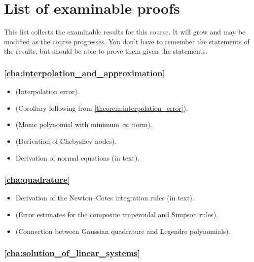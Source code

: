 \chapter*{List of examinable proofs}%
This list collects the examinable results for this course.
It will grow and may be modified as the course progresses.
You don't have to remember the statements of the results,
but should be able to prove them given the statements.

\subsection*{\cref{cha:interpolation_and_approximation}}%

\begin{itemize}
    \item {} (Interpolation error).
    \item {} (Corollary following from \cref{theorem:interpolation_error}).
    \item {} (Monic polynomial with minimum~$\infty$ norm).
    \item {} (Derivation of Chebyshev nodes).
    \item Derivation of normal equations (in text).
\end{itemize}

\subsection*{\cref{cha:quadrature}}%

\begin{itemize}
    \item Derivation of the Newton--Cotes integration rules (in text).
    \item {} 
        (Error estimates for the composite trapezoidal and Simpson rules).
    \item
        (Connection between Gaussian quadrature and Legendre polynomials).
\end{itemize}

\subsection*{\cref{cha:solution_of_linear_systems}}%

